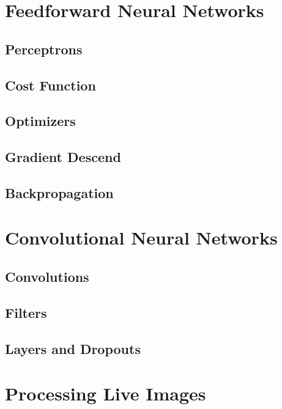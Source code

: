 \documentclass[a4paper,english]{report}
\begin{document}

        \chapter{Feedforward Neural Networks}
        \section{Perceptrons}
        \section{Cost Function}
        \section{Optimizers}
        \section{Gradient Descend}
        \section{Backpropagation}        
        \chapter{Convolutional Neural Networks}
        \section{Convolutions}
        \section{Filters}
        \section{Layers and Dropouts}
        \chapter{Processing Live Images}
    
\end{document}
